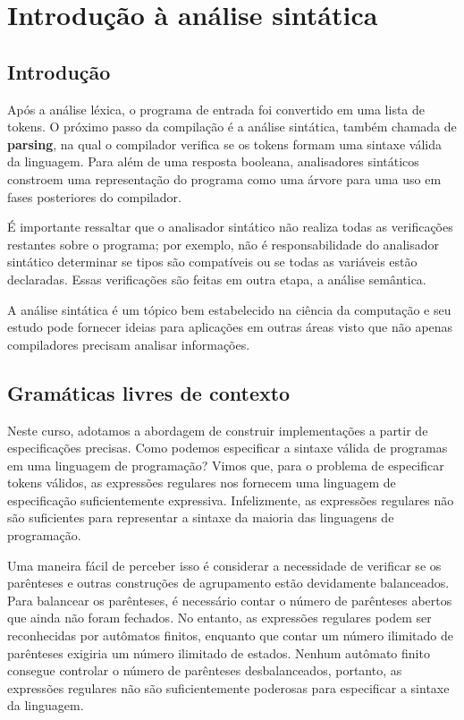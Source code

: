 \chapter{Introdução à análise sintática}

\section{Introdução}

Após a análise léxica, o programa de entrada foi convertido em uma
lista de tokens. O próximo passo da compilação é a análise sintática,
também chamada de \textbf{parsing}, na qual o compilador verifica se
os tokens formam uma sintaxe válida da linguagem. Para além de uma
resposta booleana, analisadores sintáticos constroem uma
representação do programa como uma árvore para uma uso em fases
posteriores do compilador.

É importante ressaltar que o analisador sintático não realiza todas
as verificações restantes sobre o programa; por exemplo, não é
responsabilidade do analisador sintático determinar se tipos são
compatíveis ou se todas as variáveis estão declaradas. Essas
verificações são feitas em outra etapa, a análise semântica.

A análise sintática é um tópico bem estabelecido na ciência da
computação e seu estudo pode fornecer ideias para aplicações em
outras áreas visto que não apenas compiladores precisam analisar informações.

\section{Gramáticas livres de contexto}

Neste curso, adotamos a abordagem de construir implementações a
partir de especificações precisas. Como podemos especificar a sintaxe
válida de programas em uma linguagem de programação? Vimos que, para
o problema de especificar tokens válidos, as expressões regulares nos
fornecem uma linguagem de especificação suficientemente expressiva.
Infelizmente, as expressões regulares não são suficientes para
representar a sintaxe da maioria das linguagens de programação.

Uma maneira fácil de perceber isso é considerar a necessidade de
verificar se os parênteses e outras construções de agrupamento estão
devidamente balanceados. Para balancear os parênteses, é necessário
contar o número de parênteses abertos que ainda não foram fechados.
No entanto, as expressões regulares podem ser reconhecidas por
autômatos finitos, enquanto que contar um número ilimitado de
parênteses exigiria um número ilimitado de estados. Nenhum autômato
finito consegue controlar o número de parênteses desbalanceados,
portanto, as expressões regulares não são suficientemente poderosas
para especificar a sintaxe da linguagem.

